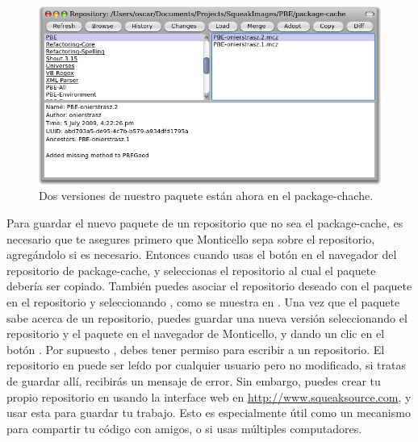 \documentclass[spanish,a4paper,10pt,twoside]{book}
\begin{document}
\begin{figure}[tbp]
	\begin{center}
	\includegraphics[width=\textwidth]{package-cache-browser}
	\end{center}
	\caption{Dos versiones de nuestro paquete est\'an ahora en el package-chache.}
\end{figure}

Para guardar el nuevo paquete de un repositorio que no sea el package-cache, es
necesario que te asegures primero que Monticello sepa sobre el repositorio, agreg\'andolo si es necesario. Entonces cuando usas el bot\'on  en el navegador del repositorio de package-cache, y seleccionas el repositorio al cual el paquete deber\'ia ser copiado.
Tambi\'en puedes asociar el repositorio deseado con el paquete   en el repositorio y seleccionando , como se muestra en .
Una vez que el paquete sabe acerca de un repositorio, puedes guardar una nueva versi\'on seleccionando el repositorio y el paquete en el navegador de Monticello, y dando un clic en el bot\'on .
Por supuesto , debes tener permiso para escribir a un repositorio.
El repositorio  en \emphind{\sqsrc} puede ser le\'ido por cualquier usuario pero no modificado, si tratas de guardar all\'i, recibir\'as un mensaje de error.
Sin embargo, puedes crear tu propio repositorio en \sqsrc usando la interface web en \url{http://www.squeaksource.com}, y usar esta para guardar tu trabajo.
Esto es especialmente \'util como un mecanismo para compartir tu c\'odigo con amigos, o si usas m\'ultiples computadores.
\end{document}
